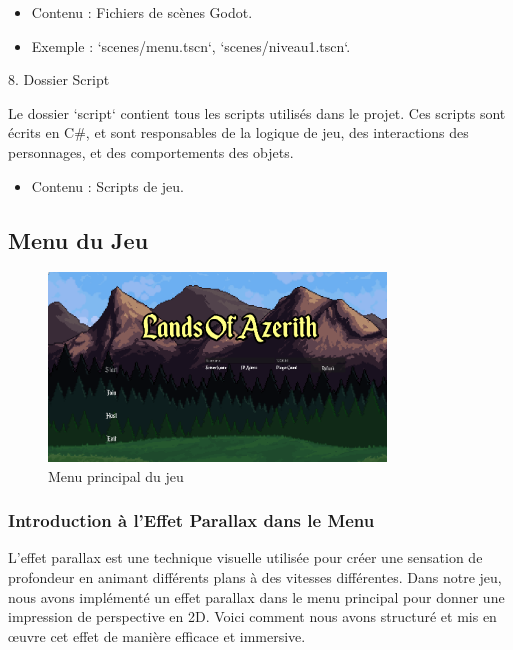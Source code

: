 \begin{itemize}
      \item Contenu : Fichiers de scènes Godot.
      \item Exemple : `scenes/menu.tscn`, `scenes/niveau1.tscn`.
            \\
\end{itemize}

8. Dossier Script

Le dossier `script` contient tous les scripts utilisés dans le projet. 
Ces scripts sont écrits en C\#, et sont responsables de la logique de jeu, des interactions des personnages, et des comportements des objets.

\begin{itemize}
      \item Contenu : Scripts de jeu.
\end{itemize}

\subsection{Menu du Jeu}

\begin{figure}[H]
      \centering
      \includegraphics[width=0.8\textwidth]{assets/game_menu.png}
      \caption{Menu principal du jeu}
      \label{fig:game_menu}
\end{figure}

\subsubsection{Introduction à l'Effet Parallax dans le Menu}

L'effet parallax est une technique visuelle utilisée pour créer une sensation de profondeur en animant différents plans à des vitesses différentes.
Dans notre jeu, nous avons implémenté un effet parallax dans le menu principal pour donner une impression de perspective en 2D.
Voici comment nous avons structuré et mis en œuvre cet effet de manière efficace et immersive.

